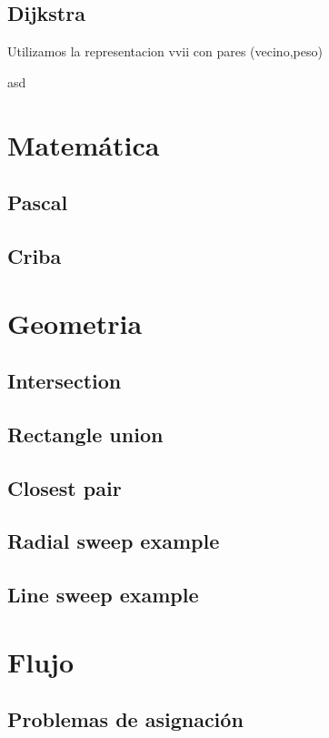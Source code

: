 \documentclass[oneside]{book}
\begin{document}
	\section{Dijkstra}
	Utilizamos la representacion vvii con pares (vecino,peso)
	\begin{codigo}
	asd
	\end{codigo}
	\chapter{Matem\'atica}
	\section{Pascal}
	
	\section{Criba}
	
	
	\chapter{Geometria}
	\section{Intersection}
	
	\section{Rectangle union}
	
	\section{Closest pair}
	
	\section{Radial sweep example}
	
	\section{Line sweep example}
	
	\chapter{Flujo}
	\section{Problemas de asignaci\'on}
\end{document}
